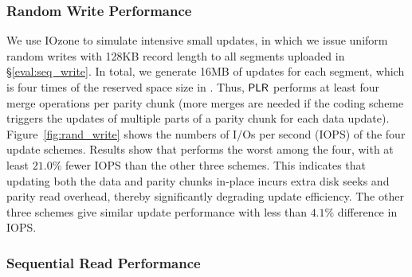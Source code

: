 \subsubsection{Random Write Performance}
\label{eval:rand_write}

We use IOzone to simulate intensive small updates, in which we issue uniform
random writes with 128KB record length to all segments uploaded in
\S\ref{eval:seq_write}.  In total, we generate 16MB of updates for each
segment, which is four times of the reserved space size in \PLR.  Thus, $\textsf{PLR}$
performs at least four merge operations per parity chunk (more merges are
needed if the coding scheme triggers the updates of multiple parts of a parity
chunk for each data update). 
Figure~\ref{fig:rand_write} shows the numbers of I/Os per second (IOPS) 
of the four update schemes.  Results show that \FO performs the worst among
the four, with at least $21.0\%$ fewer IOPS than the other three schemes. This
indicates that updating both the data and parity chunks in-place incurs extra
disk seeks and parity read overhead, thereby significantly degrading update
efficiency.  The other three schemes give similar update performance with less
than ${4.1}\%$ difference in IOPS.

%
%


\subsubsection{Sequential Read Performance} 
\label{eval:seq_read} 


